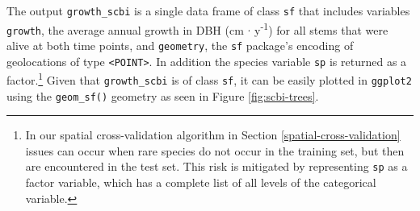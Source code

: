 \documentclass[12pt]{article}
\newenvironment{Shaded}{\begin{snugshade}}{\end{snugshade}}
\newcommand{\CommentTok}[1]{\textcolor[rgb]{0.56,0.35,0.01}{\textit{#1}}}
\newcommand{\DataTypeTok}[1]{\textcolor[rgb]{0.13,0.29,0.53}{#1}}
\newcommand{\DecValTok}[1]{\textcolor[rgb]{0.00,0.00,0.81}{#1}}
\newcommand{\KeywordTok}[1]{\textcolor[rgb]{0.13,0.29,0.53}{\textbf{#1}}}
\newcommand{\NormalTok}[1]{#1}
\newcommand{\OperatorTok}[1]{\textcolor[rgb]{0.81,0.36,0.00}{\textbf{#1}}}
\newcommand{\StringTok}[1]{\textcolor[rgb]{0.31,0.60,0.02}{#1}}
\begin{document}
\begin{Shaded}
\end{Shaded}

The output \texttt{growth\_scbi} is a single data frame of class
\texttt{sf} that includes variables \texttt{growth}, the average annual
growth in DBH (cm \(\cdot\) y\textsuperscript{-1}) for all stems that
were alive at both time points, and \texttt{geometry}, the \texttt{sf}
package's encoding of geolocations of type
\texttt{\textless{}POINT\textgreater{}}. In addition the species
variable \texttt{sp} is returned as a factor.\footnote{In our spatial
  cross-validation algorithm in Section \ref{spatial-cross-validation}
  issues can occur when rare species do not occur in the training set,
  but then are encountered in the test set. This risk is mitigated by
  representing \texttt{sp} as a factor variable, which has a complete
  list of all levels of the categorical variable.} Given that
\texttt{growth\_scbi} is of class \texttt{sf}, it can be easily plotted
in \texttt{ggplot2} using the \texttt{geom\_sf()} geometry as seen in
Figure \ref{fig:scbi-trees}.
\end{document}
